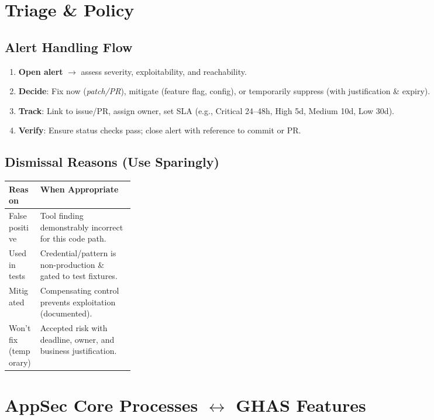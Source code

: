 \documentclass[10pt,a4paper]{article}
\begin{document}
\section{Triage \& Policy}

\subsection*{Alert Handling Flow}
\begin{enumerate}
  \item \textbf{Open alert} $\rightarrow$ assess severity, exploitability, and reachability.
  \item \textbf{Decide}: Fix now (\emph{patch/PR}), mitigate (feature flag, config), or temporarily suppress (with justification \& expiry).
  \item \textbf{Track}: Link to issue/PR, assign owner, set SLA (e.g., Critical 24--48h, High 5d, Medium 10d, Low 30d).
  \item \textbf{Verify}: Ensure status checks pass; close alert with reference to commit or PR.
\end{enumerate}

\subsection*{Dismissal Reasons (Use Sparingly)}
\begin{tabularx}{\linewidth}{@{}>{\raggedright\arraybackslash}p{0.25\linewidth}X@{}}
\toprule
\textbf{Reason} & \textbf{When Appropriate}\\
\midrule
False positive & Tool finding demonstrably incorrect for this code path.\\
Used in tests & Credential/pattern is non-production \& gated to test fixtures.\\
Mitigated & Compensating control prevents exploitation (documented).\\
Won't fix (temporary) & Accepted risk with deadline, owner, and business justification.\\
\bottomrule
\end{tabularx}

\section{\texorpdfstring{AppSec Core Processes $\leftrightarrow$ GHAS Features}{AppSec Core Processes and GHAS Features}}
\end{document}

